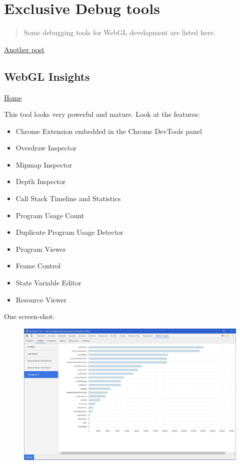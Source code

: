 \section{Exclusive Debug tools}\label{exclusive-debug-tools}

\begin{quote}
Some debugging tools for WebGL development are listed here.
\end{quote}

\href{http://www.realtimerendering.com/blog/webgl-debugging-and-profiling-tools/}{Another
post}

\subsection{WebGL Insights}\label{webgl-insights}

\href{https://github.com/3Dparallax/insight}{Home}

This tool looks very powerful and mature. Look at the features:

\begin{itemize}
\tightlist
\item
  Chrome Extension embedded in the Chrome DevTools panel
\item
  Overdraw Inspector
\item
  Mipmap Inspector
\item
  Depth Inspector
\item
  Call Stack Timeline and Statistics
\item
  Program Usage Count
\item
  Duplicate Program Usage Detector
\item
  Program Viewer
\item
  Frame Control
\item
  State Variable Editor
\item
  Resource Viewer
\end{itemize}

One screen-shot:

\begin{figure}[htbp]
\centering
\includegraphics{insight.jpeg}
\caption{}
\end{figure}


